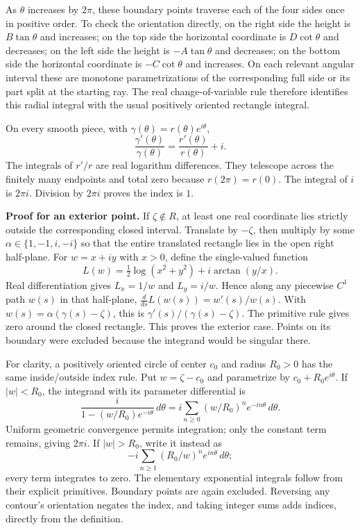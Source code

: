 \documentclass[
  11pt,
]{article}
\begin{document}
As \(\theta\) increases by \(2\pi\), these boundary points traverse each
of the four sides once in positive order. To check the orientation
directly, on the right side the height is \(B\tan\theta\) and increases;
on the top side the horizontal coordinate is \(D\cot\theta\) and
decreases; on the left side the height is \(-A\tan\theta\) and
decreases; on the bottom side the horizontal coordinate is
\(-C\cot\theta\) and increases. On each relevant angular interval these
are monotone parametrizations of the corresponding full side or its part
split at the starting ray. The real change-of-variable rule therefore
identifies this radial integral with the usual positively oriented
rectangle integral.

On every smooth piece, with \(\gamma(\theta)=r(\theta)e^{i\theta}\), \[
\frac{\gamma'(\theta)}{\gamma(\theta)}
=\frac{r'(\theta)}{r(\theta)}+i.
\] The integrals of \(r'/r\) are real logarithm differences. They
telescope across the finitely many endpoints and total zero because
\(r(2\pi)=r(0)\). The integral of \(i\) is \(2\pi i\). Division by
\(2\pi i\) proves the index is \(1\).

\textbf{Proof for an exterior point.} If \(\zeta\notin R\), at least one
real coordinate lies strictly outside the corresponding closed interval.
Translate by \(-\zeta\), then multiply by some
\(\alpha\in\{1,-1,i,-i\}\) so that the entire translated rectangle lies
in the open right half-plane. For \(w=x+iy\) with \(x>0\), define the
single-valued function \[
L(w)=\tfrac12\log(x^2+y^2)+i\arctan(y/x).
\] Real differentiation gives \(L_x=1/w\) and \(L_y=i/w\). Hence along
any piecewise \(C^1\) path \(w(s)\) in that half-plane,
\(\frac{d}{ds}L(w(s))=w'(s)/w(s)\). With
\(w(s)=\alpha(\gamma(s)-\zeta)\), this is
\(\gamma'(s)/(\gamma(s)-\zeta)\). The primitive rule gives zero around
the closed rectangle. This proves the exterior case. Points on its
boundary were excluded because the integrand would be singular there.

For clarity, a positively oriented circle of center \(c_0\) and radius
\(R_0>0\) has the same inside/outside index rule. Put \(w=\zeta-c_0\)
and parametrize by \(c_0+R_0e^{i\theta}\). If \(|w|<R_0\), the integrand
with its parameter differential is \[
\frac{i}{1-(w/R_0)e^{-i\theta}}\,d\theta
=i\sum_{n\geq0}(w/R_0)^n e^{-in\theta}\,d\theta.
\] Uniform geometric convergence permits integration; only the constant
term remains, giving \(2\pi i\). If \(|w|>R_0\), write it instead as \[
-i\sum_{n\geq1}(R_0/w)^n e^{in\theta}\,d\theta;
\] every term integrates to zero. The elementary exponential integrals
follow from their explicit primitives. Boundary points are again
excluded. Reversing any contour's orientation negates the index, and
taking integer sums adds indices, directly from the definition.
\end{document}
